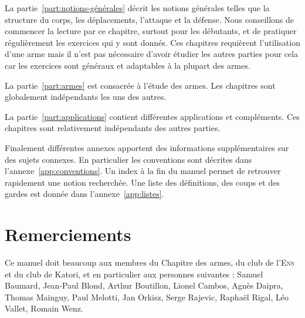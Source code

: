 La partie~\ref{part:notions-générales} décrit les notions générales telles que la structure du corps, les déplacements, l'attaque et la défense.
Nous conseillons de commencer la lecture par ce chapitre, surtout pour les débutants, et de pratiquer régulièrement les exercices qui y sont donnés.
Ces chapitres requièrent l'utilisation d'une arme mais il n'est pas nécessaire d'avoir étudier les autres parties pour cela car les exercices sont généraux et adaptables à la plupart des armes.

La partie~\ref{part:armes} est consacrée à l'étude des armes.
Les chapitres sont globalement indépendants les uns des autres.

La partie~\ref{part:applications} contient différentes applications et compléments.
Ces chapitres sont relativement indépendants des autres parties.

Finalement différentes annexes apportent des informations supplémentaires sur des sujets connexes.
En particulier les conventions sont décrites dans l'annexe~\ref{app:conventions}.
Un index à la fin du manuel permet de retrouver rapidement une notion recherchée.
Une liste des définitions, des coups et des gardes est donnée dans l'annexe~\ref{app:listes}.



\section{Remerciements}


Ce manuel doit beaucoup aux membres du Chapitre des armes, du club de l'\textsc{Ens} et du club de Katori, et en particulier aux personnes suivantes : Samuel Baumard, Jean-Paul Blond, Arthur Boutillon, Lionel Cambos, Agnès Daipra, Thomas Mainguy, Paul Melotti, Jan Orkisz, Serge Rajevic, Raphaël Rigal, Léo Vallet, Romain Wenz.
